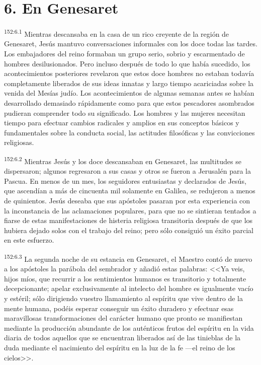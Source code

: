 \section*{6. En Genesaret}
\par 
\textsuperscript{152:6.1} Mientras descansaba en la casa de un rico creyente de la región de Genesaret, Jesús mantuvo conversaciones informales con los doce todas las tardes. Los embajadores del reino formaban un grupo serio, sobrio y escarmentado de hombres desilusionados. Pero incluso después de todo lo que había sucedido, los acontecimientos posteriores revelaron que estos doce hombres no estaban todavía completamente liberados de sus ideas innatas y largo tiempo acariciadas sobre la venida del Mesías judío. Los acontecimientos de algunas semanas antes se habían desarrollado demasiado rápidamente como para que estos pescadores asombrados pudieran comprender todo su significado. Los hombres y las mujeres necesitan tiempo para efectuar cambios radicales y amplios en sus conceptos básicos y fundamentales sobre la conducta social, las actitudes filosóficas y las convicciones religiosas.

\par 
\textsuperscript{152:6.2} Mientras Jesús y los doce descansaban en Genesaret, las multitudes se dispersaron; algunos regresaron a sus casas y otros se fueron a Jerusalén para la Pascua. En menos de un mes, los seguidores entusiastas y declarados de Jesús, que ascendían a más de cincuenta mil solamente en Galilea, se redujeron a menos de quinientos. Jesús deseaba que sus apóstoles pasaran por esta experiencia con la inconstancia de las aclamaciones populares, para que no se sintieran tentados a fiarse de estas manifestaciones de histeria religiosa transitoria después de que los hubiera dejado solos con el trabajo del reino; pero sólo consiguió un éxito parcial en este esfuerzo.

\par 
\textsuperscript{152:6.3} La segunda noche de su estancia en Genesaret, el Maestro contó de nuevo a los apóstoles la parábola del sembrador y añadió estas palabras: <<Ya veis, hijos míos, que recurrir a los sentimientos humanos es transitorio y totalmente decepcionante; apelar exclusivamente al intelecto del hombre es igualmente vacío y estéril; sólo dirigiendo vuestro llamamiento al espíritu que vive dentro de la mente humana, podéis esperar conseguir un éxito duradero y efectuar esas maravillosas transformaciones del carácter humano que pronto se manifiestan mediante la producción abundante de los auténticos frutos del espíritu en la vida diaria de todos aquellos que se encuentran liberados así de las tinieblas de la duda mediante el nacimiento del espíritu en la luz de la fe ---el reino de los cielos>>.

